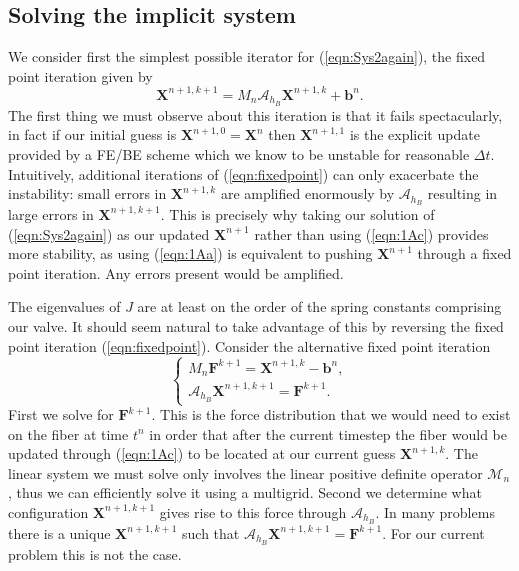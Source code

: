 \documentclass[preprint,12pt]{elsarticle}
\begin{document}
\subsection{Solving the implicit system}
We consider first the simplest possible iterator for (\ref{eqn:Sys2again}), the fixed point iteration given by
\begin{equation}
\mathbf{X}^{n+1,k+1} = \mathit{M}_n\mathcal{A}_{h_B} \mathbf{X}^{n+1,k} + \mathbf{b}^n.
\label{eqn:fixedpoint}
\end{equation}
The first thing we must observe about this iteration is that it fails spectacularly, in fact if our initial guess is $\mathbf{X}^{n+1,0}=\mathbf{X}^n$ then $\mathbf{X}^{n+1,1}$ is the explicit update provided by a FE/BE scheme which we know to be unstable for reasonable $\Delta t$. Intuitively, additional iterations of (\ref{eqn:fixedpoint}) can only exacerbate the instability: small errors in $\mathbf{X}^{n+1,k}$ are amplified enormously by $\mathcal{A}_{h_B}$ resulting in large errors in $\mathbf{X}^{n+1,k+1}$. This is precisely why taking our solution of (\ref{eqn:Sys2again}) as our updated $\mathbf{X}^{n+1}$ rather than using (\ref{eqn:1Ac}) provides more stability, as using (\ref{eqn:1Aa}) is equivalent to pushing $\mathbf{X}^{n+1}$ through a fixed point iteration. Any errors present would be amplified.

The eigenvalues of $J$ are at least on the order of the spring constants comprising our valve. It should seem natural to take advantage of this by reversing the fixed point iteration (\ref{eqn:fixedpoint}). Consider the alternative fixed point iteration
\begin{equation}
\left\{
\begin{gathered}
\mathit{M}_n\mathbf{F}^{k+1} = \mathbf{X}^{n+1,k} - \mathbf{b}^n,\\
\mathcal{A}_{h_B}\mathbf{X}^{n+1,k+1} = \mathbf{F}^{k+1}.
\end{gathered}
\right.
\label{eqn:fixedpoint2}
\end{equation}
First we solve for $\mathbf{F}^{k+1}$. This is the force distribution that we would need to exist on the fiber at time $t^n$ in order that after the current timestep the fiber would be updated through (\ref{eqn:1Ac}) to be located at our current guess $\mathbf{X}^{n+1,k}$. The linear system we must solve only involves the linear positive definite operator $\mathcal{M}_n$, thus we can efficiently solve it using a multigrid. Second we determine what configuration $\mathbf{X}^{n+1,k+1}$ gives rise to this force through $\mathcal{A}_{h_B}$.
In many problems there is a unique $\mathbf{X}^{n+1,k+1}$ such that
$\mathcal{A}_{h_B}\mathbf{X}^{n+1,k+1} = \mathbf{F}^{k+1}$. For our current problem this is not the case.
\end{document}
